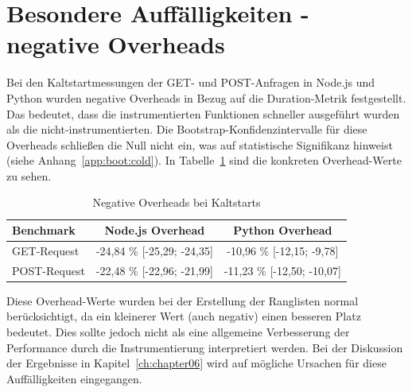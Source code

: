 \section{Besondere Auffälligkeiten - negative Overheads}
Bei den Kaltstartmessungen der GET- und POST-Anfragen in Node.js und Python wurden negative Overheads in Bezug auf die Duration-Metrik 
festgestellt. Das bedeutet, dass die instrumentierten Funktionen schneller ausgeführt wurden als die nicht-instrumentierten. 
Die Bootstrap-Konfidenzintervalle für diese Overheads schließen die Null nicht ein, was auf statistische Signifikanz hinweist (siehe Anhang~\ref{app:boot:cold}). 
In Tabelle~\ref{tab:negative-overheads} sind die konkreten Overhead-Werte zu sehen. 
\begin{table}[H]
\centering
\footnotesize
\setlength{\tabcolsep}{8pt}
\caption{Negative Overheads bei Kaltstarts}
\label{tab:negative-overheads}
\begin{tabular}{|l|c|c|}
\hline
\textbf{Benchmark} & \textbf{Node.js Overhead} & \textbf{Python Overhead} \\
\hline
GET-Request & -24,84 \% [-25,29; -24,35] & -10,96 \% [-12,15; -9,78] \\
\hline
POST-Request & -22,48 \% [-22,96; -21,99] & -11,23 \% [-12,50; -10,07] \\
\hline
\end{tabular}
\end{table}

Diese Overhead-Werte wurden bei der Erstellung der Ranglisten normal berücksichtigt, da ein kleinerer Wert (auch negativ) einen besseren Platz bedeutet. 
Dies sollte jedoch nicht als eine allgemeine Verbesserung der Performance durch die Instrumentierung interpretiert werden. Bei der Diskussion 
der Ergebnisse in Kapitel~\ref{ch:chapter06} wird auf mögliche Ursachen für diese Auffälligkeiten eingegangen.
